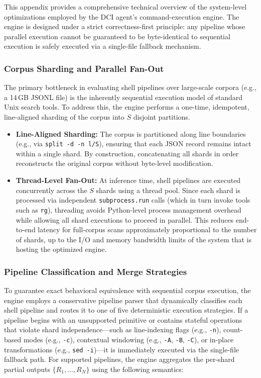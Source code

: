 \documentclass{llmxive}
\begin{document}

This appendix provides a comprehensive technical overview of the system-level optimizations employed by the DCI agent’s command-execution engine. The engine is designed under a strict correctness-first principle: any pipeline whose parallel execution cannot be guaranteed to be byte-identical to sequential execution is safely executed via a single-file fallback mechanism.


\subsubsection{Corpus Sharding and Parallel Fan-Out}


The primary bottleneck in evaluating shell pipelines over large-scale corpora (e.g., a 14\,GB JSONL file) is the inherently sequential execution model of standard Unix search tools. To address this, the engine performs a one-time, idempotent, line-aligned sharding of the corpus into $S$ disjoint partitions.

\begin{itemize}[leftmargin=1.2em]
    \item \textbf{Line-Aligned Sharding:} The corpus is partitioned along line boundaries (e.g., via \texttt{split -d -n l/S}), ensuring that each JSON record remains intact within a single shard. By construction, concatenating all shards in order reconstructs the original corpus without byte-level modification.

    \item \textbf{Thread-Level Fan-Out:} At inference time, shell pipelines are executed concurrently across the $S$ shards using a thread pool. Since each shard is processed via independent \texttt{subprocess.run} calls (which in turn invoke tools such as \texttt{rg}), threading avoids Python-level process management overhead while allowing all shard executions to proceed in parallel. This reduces end-to-end latency for full-corpus scans approximately proportional to the number of shards, up to the I/O and memory bandwidth limits of the system that is hosting the optimized engine.
\end{itemize}

\subsubsection{Pipeline Classification and Merge Strategies}

To guarantee exact behavioral equivalence with sequential corpus execution, the engine employs a conservative pipeline parser that dynamically classifies each shell pipeline and routes it to one of five deterministic execution strategies. If a pipeline begins with an unsupported primitive or contains stateful operations that violate shard independence---such as line-indexing flags (e.g., \texttt{-n}), count-based modes (e.g., \texttt{-c}), contextual windowing (e.g., \texttt{-A}, \texttt{-B}, \texttt{-C}), or in-place transformations (e.g., \texttt{sed -i})---it is immediately executed via the single-file fallback path. For supported pipelines, the engine aggregates the per-shard partial outputs $\{R_1, \dots, R_N\}$ using the following semantics:
\end{document}
